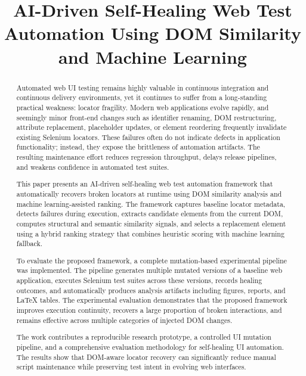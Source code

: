 \documentclass[conference]{IEEEtran}
\title{AI-Driven Self-Healing Web Test Automation Using DOM Similarity and Machine Learning}
\author{
\IEEEauthorblockN{Vijay Javvadi}
\IEEEauthorblockA{Independent Researcher\\
AI-Driven Test Automation and Intelligent Quality Engineering\\
\texttt{vijayjavvadiresearch.ai}}
}
\begin{document}
\maketitle

\begin{abstract}
Automated web UI testing remains highly valuable in continuous integration and continuous delivery environments, yet it continues to suffer from a long-standing practical weakness: locator fragility. Modern web applications evolve rapidly, and seemingly minor front-end changes such as identifier renaming, DOM restructuring, attribute replacement, placeholder updates, or element reordering frequently invalidate existing Selenium locators. These failures often do not indicate defects in application functionality; instead, they expose the brittleness of automation artifacts. The resulting maintenance effort reduces regression throughput, delays release pipelines, and weakens confidence in automated test suites.

This paper presents an AI-driven self-healing web test automation framework that automatically recovers broken locators at runtime using DOM similarity analysis and machine learning-assisted ranking. The framework captures baseline locator metadata, detects failures during execution, extracts candidate elements from the current DOM, computes structural and semantic similarity signals, and selects a replacement element using a hybrid ranking strategy that combines heuristic scoring with machine learning fallback.

To evaluate the proposed framework, a complete mutation-based experimental pipeline was implemented. The pipeline generates multiple mutated versions of a baseline web application, executes Selenium test suites across these versions, records healing outcomes, and automatically produces analysis artifacts including figures, reports, and LaTeX tables. The experimental evaluation demonstrates that the proposed framework improves execution continuity, recovers a large proportion of broken interactions, and remains effective across multiple categories of injected DOM changes.

The work contributes a reproducible research prototype, a controlled UI mutation pipeline, and a comprehensive evaluation methodology for self-healing UI automation. The results show that DOM-aware locator recovery can significantly reduce manual script maintenance while preserving test intent in evolving web interfaces.
\end{abstract}
\end{document}
